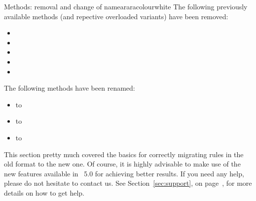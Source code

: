 \begin{messagebox}{Methods: removal and change of name}{araracolour}{\icinfo}{white}
The following previously available methods (and repective overloaded variants) have been removed:

\begin{itemize}
\item {}
\item {}
\item {}
\item {}
\item {}
\end{itemize}

The following methods have been renamed:
\begin{itemize}
\item {} to 
\item {} to 
\item {} to 
\end{itemize}
\end{messagebox}

This section pretty much covered the basics for correctly migrating rules in the old format to the new one. Of course, it is highly advisable to make use of the new features available in \arara\ 5.0 for achieving better results. If you need any help, please do not hesitate to contact us. See Section~\ref{sec:support}, on page~\pageref{sec:support}, for more details on how to get help.
